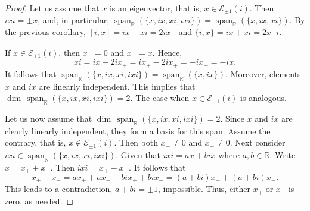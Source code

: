 \documentclass{amsart}
\theoremstyle{definition}
\theoremstyle{plain}
\begin{document}
\begin{proof}

Let us assume that $x$ is an eigenvector, that is, $x\in\mathcal{E}_{\pm1}(i)$.  Then $ixi={\pm}x$, and, in particular, 
$\operatorname{span}_{\mathbb R}(\{x,ix,xi,ixi\}) = \operatorname{span}_{\mathbb R}(\{x,ix,xi\}).$ By the previous corollary, 
$[i, x] = ix - xi = 2i x_{+}$ and $\{i, x\} = ix +xi = 2x_{-} i.$ 

If $x \in \mathcal{E}_{+1}(i)$, then $x_{-} = 0$ and $x_{+} = x$.  Hence, 
$$ xi = ix - 2ix_{+} = ix_{+} - 2i x_{+} = -ix_{+} = -ix.$$
It follows that $\operatorname{span}_{\mathbb R}(\{x,ix,xi,ixi\}) = \operatorname{span}_{\mathbb R}(\{x,ix\}).$ Moreover, 
elements $x$ and $ix$ are linearly independent. This implies that $\dim\,\operatorname{span}_{\mathbb R}(\{x,ix,xi,ixi\}) = 2$. The case when $x \in \mathcal{E}_{-1}(i)$ is 
analogous.

Let us now assume that $\dim\,\operatorname{span}_{\mathbb R}(\{x,ix,xi,ixi\}) = 2$.  Since $x$ and $ix$ are clearly linearly independent, they form a basis for this span.  Assume the
contrary, that is, $x \notin \mathcal{E}_{\pm1}(i)$. Then both $x_{+} \neq 0$ and $x_{-} \neq 0$.  Next consider $ixi \in \operatorname{span}_{\mathbb R}(\{x,ix,xi,ixi\})$. Given that
$ixi = a x + b ix$ where $a, b\in \mathbb R$. Write $x = x_{+} + x_{-}$. Then $ixi = x_{+} - x_{-}$. It follows that 
$$ x_{+} - x_{-} = ax_{+} + ax_{-} + bi x_{+} + bi x_{-} = (a+bi)x_{+} + (a+bi) x_{-}.$$ This leads to a contradiction, $a+bi = \pm 1$, impossible.
Thus, either $x_{+}$ or $x_{-}$ is zero, as needed.    




\end{proof}
\end{document}

